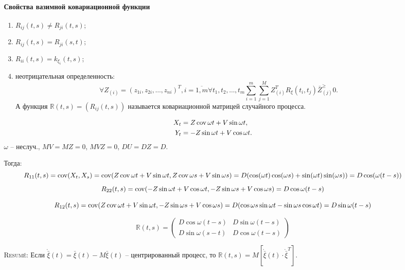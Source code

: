 \paragraph{Свойства вазимной ковариационной функции}
\begin{enumerate}
  \item $R_{ij}(t, s) \neq R_{ji} (t, s)$;
  \item $R_{ij}(t, s) = R_{ji} (s, t)$;
  \item $R_{ii} (t, s) = k_{\xi_i} (t, s)$;
  \item неотрицательная определенность:
    \[
      \forall Z_{(i)} = (z_{1i}, z_{2i}, \dots, z_{ni})^T, i = \overline{1, m}
      \forall t_1, t_2, \dots, t_m
      \sum_{i=1}^m \sum_{j=1}^M Z_{(i)}^T R_\xi(t_i, t_j) \bar{Z}_{(j)}^ \geqslant 0.
    \]
  А функция $\mathbb{R}(t, s) = (R_{ij}(t, s))$ называется ковариационной матрицей случайного процесса.
\end{enumerate}

\begin{ex}
  \begin{align*}
    X_t &= Z \operatorname{cov} \omega t + V \sin \omega t, \\
    Y_t &= -Z \sin \omega t + V \cos \omega t.
  \end{align*}
  $\omega$ -- неслуч., $MV = MZ = 0$, $MVZ = 0$, $DU = DZ = D$.

  Тогда:
  \[
    R_{11}(t, s) = \operatorname{cov}(X_t, X_s)
    = \operatorname{cov}( Z \operatorname{cov} \omega t + V \sin \omega t, Z \operatorname{cov} \omega s + V \sin \omega s )
    = D (\cos(\omega t) \cos(\omega s) + \sin(\omega t) \sin(\omega s))
    = D \cos(\omega (t-s))
  \]
  \[
    R_{22}(t, s) = \operatorname{cov}(-Z \sin \omega t + V \cos \omega t, -Z \sin \omega s + V \cos \omega s)
    = D \cos\omega (t-s)
  \]

  \[
    R_{12}(t, s) = \operatorname{cov}(Z \operatorname{cov} \omega t + V \sin \omega t, -Z \sin \omega s + V \cos \omega s)
    = D(\cos\omega s \sin\omega t - \sin\omega s \cos\omega t)
    = D \sin\omega(t-s)
  \]



  \[
    \mathbb{R}(t, s) = \begin{pmatrix}
      D \cos\omega(t-s) & D \sin\omega(t-s) \\
      D \sin\omega(s-t) & D \cos\omega (t-s)
    \end{pmatrix} 
  \]
\end{ex}

\textsc{Resum\'e}: Если $\mathring{\bar{\xi}}(t) = \bar{\xi}(t) - M\bar{\xi}(t)$ -- центрированный процесс,
то $\mathbb{R}(t, s) = M \left[ \mathring{\bar{\xi}}(t) \cdot \mathring{\bar{\xi}}^T \right] $.

